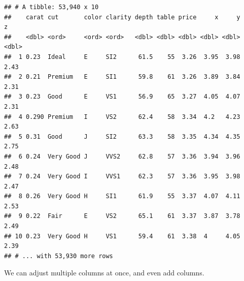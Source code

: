 \documentclass[
]{book}
\newenvironment{Shaded}{\begin{snugshade}}{\end{snugshade}}
\newcommand{\DataTypeTok}[1]{\textcolor[rgb]{0.13,0.29,0.53}{#1}}
\newcommand{\DecValTok}[1]{\textcolor[rgb]{0.00,0.00,0.81}{#1}}
\newcommand{\KeywordTok}[1]{\textcolor[rgb]{0.13,0.29,0.53}{\textbf{#1}}}
\newcommand{\NormalTok}[1]{#1}
\newcommand{\OperatorTok}[1]{\textcolor[rgb]{0.81,0.36,0.00}{\textbf{#1}}}
\newcommand{\StringTok}[1]{\textcolor[rgb]{0.31,0.60,0.02}{#1}}
\begin{document}
\begin{Shaded}
\end{Shaded}

\begin{verbatim}
## # A tibble: 53,940 x 10
##    carat cut       color clarity depth table price     x     y     z
##    <dbl> <ord>     <ord> <ord>   <dbl> <dbl> <dbl> <dbl> <dbl> <dbl>
##  1 0.23  Ideal     E     SI2      61.5    55  3.26  3.95  3.98  2.43
##  2 0.21  Premium   E     SI1      59.8    61  3.26  3.89  3.84  2.31
##  3 0.23  Good      E     VS1      56.9    65  3.27  4.05  4.07  2.31
##  4 0.290 Premium   I     VS2      62.4    58  3.34  4.2   4.23  2.63
##  5 0.31  Good      J     SI2      63.3    58  3.35  4.34  4.35  2.75
##  6 0.24  Very Good J     VVS2     62.8    57  3.36  3.94  3.96  2.48
##  7 0.24  Very Good I     VVS1     62.3    57  3.36  3.95  3.98  2.47
##  8 0.26  Very Good H     SI1      61.9    55  3.37  4.07  4.11  2.53
##  9 0.22  Fair      E     VS2      65.1    61  3.37  3.87  3.78  2.49
## 10 0.23  Very Good H     VS1      59.4    61  3.38  4     4.05  2.39
## # ... with 53,930 more rows
\end{verbatim}

We can adjust multiple columns at once, and even add columns.

\begin{Shaded}
\end{Shaded}
\end{document}
